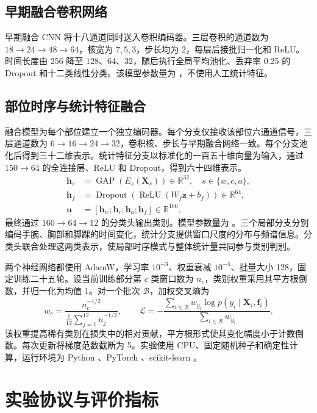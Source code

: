 \documentclass[UTF8,zihao=-4,a4paper,fontset=windows]{ctexart}
\begin{document}
\subsection{早期融合卷积网络}
早期融合 CNN 将十八通道同时送入卷积编码器。三层卷积的通道数为 $18\to24\to48\to64$，核宽为 $7,5,3$，步长均为 2，每层后接批归一化和 ReLU。时间长度由 256 降至 128、64、32，随后执行全局平均池化、丢弃率 0.25 的 Dropout 和十二类线性分类。该模型参数量为 \CNNParams，不使用人工统计特征。

\subsection{部位时序与统计特征融合}
融合模型为每个部位建立一个独立编码器。每个分支仅接收该部位六通道信号，三层通道数为 $6\to16\to24\to32$，卷积核、步长与早期融合网络一致。每个分支池化后得到三十二维表示。统计特征分支以标准化的一百五十维向量为输入，通过 $150\to64$ 的全连接层、ReLU 和 Dropout，得到六十四维表示。
\begin{align}
 \boldsymbol h_s&=\operatorname{GAP}(E_s(\boldsymbol X_s))\in\mathbb R^{32},\quad s\in\{w,c,a\},\\
 \boldsymbol h_f&=\operatorname{Dropout}(\operatorname{ReLU}(W_f\boldsymbol z+b_f))\in\mathbb R^{64},\\
 \boldsymbol u&=[\boldsymbol h_w;\boldsymbol h_c;\boldsymbol h_a;\boldsymbol h_f]\in\mathbb R^{160}.
\end{align}
最终通过 $160\to64\to12$ 的分类头输出类别。模型参数量为 \FusionParams。三个局部分支分别编码手腕、胸部和脚踝的时间变化，统计分支提供窗口尺度的分布与频谱信息。分类头联合处理这两类表示，使局部时序模式与整体统计量共同参与类别判别。

两个神经网络都使用 AdamW，学习率 $10^{-3}$、权重衰减 $10^{-4}$、批量大小 128，固定训练二十五轮。设当前训练部分第 $c$ 类窗口数为 $n_c$，类别权重采用其平方根倒数，并归一化为均值 1。对一个批次 $\mathcal B$，加权交叉熵为
\begin{equation}
w_c=\frac{n_c^{-1/2}}{\frac1{12}\sum_{j=1}^{12}n_j^{-1/2}},\qquad
\mathcal L=-\frac{\sum_{i\in\mathcal B}w_{y_i}\log p(y_i\mid\boldsymbol X_i,\boldsymbol f_i)}{\sum_{i\in\mathcal B}w_{y_i}}.
\end{equation}
该权重提高稀有类别在损失中的相对贡献，平方根形式使其变化幅度小于计数倒数。每次更新将梯度范数截断为 5。实验使用 CPU、固定随机种子和确定性计算，运行环境为 Python \PythonVersion、PyTorch \TorchVersion、scikit-learn \SklearnVersion。

\section{实验协议与评价指标}
\end{document}
